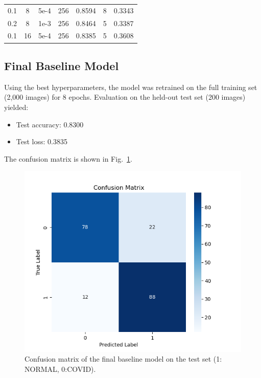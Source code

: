 \documentclass[conference]{IEEEtran}
\begin{document}
\begin{table}[htbp]
\begin{adjustbox}{width=0.48\textwidth}
\begin{tabular}{|c|c|c|c|c|c|c|}
			0.1           & 8            & 5e-4            & 256           & 0.8594           & 8            & 0.3343           \\
			0.2           & 8            & 1e-3            & 256           & 0.8464           & 5            & 0.3387           \\
			0.1           & 16           & 5e-4            & 256           & 0.8385           & 5            & 0.3608           \\
			\hline
		\end{tabular}
	\end{adjustbox}
\end{table}


\subsection{Final Baseline Model}
Using the best hyperparameters, the model was retrained on the full training set (2,000 images) for 8 epochs. Evaluation on the held-out test set (200 images) yielded:
\begin{itemize}
	\item Test accuracy: 0.8300
	\item Test loss: 0.3835
\end{itemize}
\vspace{0.5cm}

The confusion matrix is shown in Fig.~\ref{fig:conf_matrix}.

\begin{figure}[htbp]
	\centerline{\includegraphics[width=\linewidth]{Images/confusion_matrix_baseline.png}}
	\caption{Confusion matrix of the final baseline model on the test set (1: NORMAL, 0:COVID).}
	\label{fig:conf_matrix}
\end{figure}
\end{document}
